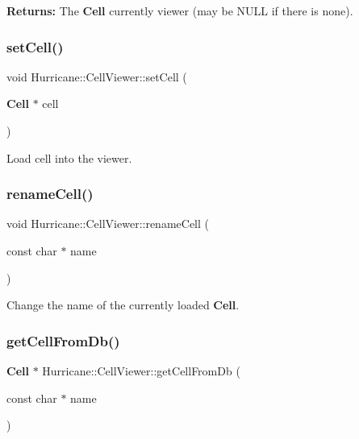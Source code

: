 {\bfseries Returns\+:} The \textbf{ Cell} currently viewer (may be {\ttfamily N\+U\+LL} if there is none). \mbox{\label{classHurricane_1_1CellViewer_a5d4707b5e364b8a3a36857103bdac45d}} 
\subsubsection{\texorpdfstring{set\+Cell()}{setCell()}}
{\footnotesize\ttfamily void Hurricane\+::\+Cell\+Viewer\+::set\+Cell (\begin{DoxyParamCaption}\item[{\textbf{ Cell} $\ast$}]{cell }\end{DoxyParamCaption})\hspace{0.3cm}{\ttfamily [virtual]}}

Load {\ttfamily cell} into the viewer. \mbox{\label{classHurricane_1_1CellViewer_ae5d3d8c58dee944d99375650c3166587}} 
\subsubsection{\texorpdfstring{rename\+Cell()}{renameCell()}}
{\footnotesize\ttfamily void Hurricane\+::\+Cell\+Viewer\+::rename\+Cell (\begin{DoxyParamCaption}\item[{const char $\ast$}]{name }\end{DoxyParamCaption})}

Change the name of the currently loaded \textbf{ Cell}. \mbox{\label{classHurricane_1_1CellViewer_a0ea301f7e85f936c38b5cd59e3752309}} 
\subsubsection{\texorpdfstring{get\+Cell\+From\+Db()}{getCellFromDb()}}
{\footnotesize\ttfamily \textbf{ Cell} $\ast$ Hurricane\+::\+Cell\+Viewer\+::get\+Cell\+From\+Db (\begin{DoxyParamCaption}\item[{const char $\ast$}]{name }\end{DoxyParamCaption})\hspace{0.3cm}{\ttfamily [virtual]}}

